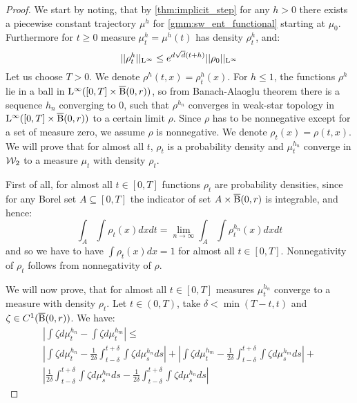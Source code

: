 \begin{proof}
We start by noting, that by \ref{thm:implicit_step} for any $h > 0$ there exists a piecewise constant trajectory $\mu^h$ for \ref{gmm:sw_ent_functional} starting at $\mu_0$. Furthermore for $t \geq 0$ measure $\mu_t^h = \mu^h(t)$ has density $\rho_t^h$, and:
\begin{equation} \label{ineq:dens_bound}
||\rho_t^h||_{\mathrm{L}^{\infty}} \leq e^{d \sqrt{d} (t+ h)} ||\rho_0||_{\mathrm{L}^{\infty}}
\end{equation}
Let us choose $T > 0$. We denote $\rho^h(t,x) = \rho_t^h(x)$. 
For $ h \leq 1$, the functions $\rho^h$ lie in a ball in $\mathrm{L}^{\infty}([0,T] \times \operatorname{\overline{B}}(0,r))$, so from Banach-Alaoglu theorem there is a sequence $h_n$ converging to $0$, such that $\rho^{h_n}$ converges in weak-star topology in $\mathrm{L}^{\infty}([0,T] \times \operatorname{\overline{B}}(0,r))$ to a certain limit $\rho$. Since $\rho$ has to be nonnegative except for a set of measure zero, we assume $\rho$ is nonnegative. We denote $\rho_t(x) = \rho(t,x)$. We will prove that for almost all $t$, $\rho_t$ is a probability density and $\mu_{t}^{h_n}$ converge in ${\cal W}_2$ to a measure $\mu_t$ with density $\rho_t$.

First of all, for almost all $t \in [0,T]$ functions $\rho_t$ are probability densities, since for any Borel set $A \subseteq [0,T]$ the indicator of set $A \times \operatorname{\overline{B}}(0,r)$ is integrable, and hence:
\[
\int_A \int \rho_t(x) dx dt = \lim_{n \rightarrow \infty} \int_A \int \rho_t^{h_n}(x) dx dt
\]
and so we have to have $\int \rho_t(x) dx = 1$ for almost all $t \in [0,T]$. Nonnegativity of $\rho_t$ follows from nonnegativity of $\rho$. 

We will now prove, that for almost all $t \in [0,T]$  measures $\mu_t^{h_n}$ converge to a measure with density $\rho_t$. Let $t \in (0,T)$, take $\delta < \min(T-t, t)$ and $\zeta \in C^1(\operatorname{\overline{B}}(0,r))$. We have:
\begin{multline} \label{ineq:mu_t_conv_bound}
\left| \int \zeta d\mu_t^{h_n} - \int \zeta d\mu_t^{h_m} \right| \leq \\ \left| \int \zeta d\mu_t^{h_n} - \frac{1}{2\delta} \int_{t - \delta}^{t + \delta} \int \zeta d\mu_s^{h_n} ds \right| + 
\left| \int \zeta d\mu_t^{h_m} - \frac{1}{2\delta} \int_{t - \delta}^{t + \delta} \int \zeta d\mu_s^{h_m} ds \right| +  \\
\left| \frac{1}{2\delta} \int_{t - \delta}^{t + \delta} \int \zeta d\mu_s^{h_m} ds - \frac{1}{2\delta} \int_{t - \delta}^{t + \delta} \int \zeta d\mu_s^{h_n} ds \right|
\end{multline}


\end{proof}
